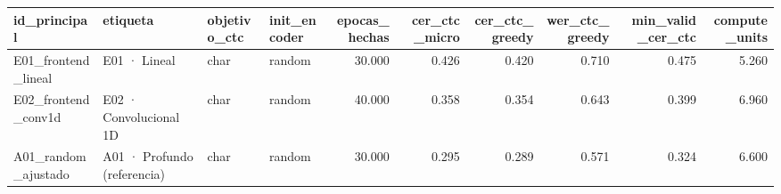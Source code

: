 \begin{tabular}{llllrrrrrr}
\toprule
id_principal & etiqueta & objetivo_ctc & init_encoder & epocas_hechas & cer_ctc_micro & cer_ctc_greedy & wer_ctc_greedy & min_valid_cer_ctc & compute_units \\
\midrule
E01_frontend_lineal & E01 · Lineal & char & random & 30.000 & 0.426 & 0.420 & 0.710 & 0.475 & 5.260 \\
E02_frontend_conv1d & E02 · Convolucional 1D & char & random & 40.000 & 0.358 & 0.354 & 0.643 & 0.399 & 6.960 \\
A01_random_ajustado & A01 · Profundo (referencia) & char & random & 30.000 & 0.295 & 0.289 & 0.571 & 0.324 & 6.600 \\
\bottomrule
\end{tabular}
